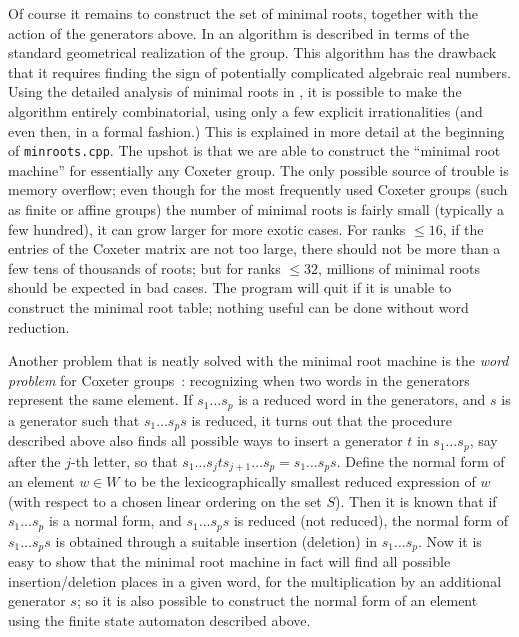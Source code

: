 \documentclass[11pt]{article}
\begin{document}
Of course it remains to construct the set of minimal roots, together with
the action of the generators above. In \cite{brink_howlett:1993} an
algorithm is described in terms of the standard geometrical realization
of the group. This algorithm has the drawback that it requires finding
the sign of potentially complicated algebraic real numbers. Using the
detailed analysis of minimal roots in \cite{brink:1998}, it is possible
to make the algorithm entirely combinatorial, using only a few explicit
irrationalities (and even then, in a formal fashion.) This is explained
in more detail at the beginning of {\tt minroots.cpp}. The upshot is that
we are able to construct the ``minimal root machine'' for essentially any
Coxeter group. The only possible source of trouble is memory overflow; even
though for the most frequently used Coxeter groups (such as finite or affine
groups) the number of minimal roots is fairly small (typically a few hundred),
it can grow larger for more exotic cases. For ranks $\leq 16$, if the
entries of the Coxeter matrix are not too large, there should not be more
than a few tens of thousands of roots; but for ranks $\leq 32$, millions
of minimal roots should be expected in bad cases. The program will quit if it 
is unable to construct the minimal root table; nothing useful can be done 
without word reduction.

Another problem that is neatly solved with the minimal root machine is the
{\em word problem} for Coxeter groups~: recognizing when two words in the
generators represent the same element. If $s_1\ldots s_p$ is a reduced word
in the generators, and $s$ is a generator such that $s_1\ldots s_ps$ is 
reduced, it turns out that the procedure described above also finds all 
possible ways to insert a generator $t$ in $s_1\ldots s_p$, say after
the $j$-th letter, so that $s_1\ldots s_jts_{j+1}\ldots s_p=s_1\ldots s_ps$.
Define the normal form of an element $w\in W$ to be the lexicographically
smallest reduced expression of $w$ (with respect to a chosen linear ordering
on the set $S$). Then it is known that if $s_1\ldots s_p$ is a normal form,
and $s_1\ldots s_ps$ is reduced (not reduced), the normal form of 
$s_1\ldots s_ps$ is obtained through a suitable insertion (deletion) in 
$s_1\ldots s_p$. Now it is easy to show that the minimal root machine in
fact will find all possible insertion/deletion places in a given word,
for the multiplication by an additional generator $s$; so it is also
possible to construct the normal form of an element using the finite state
automaton described above.
\end{document}
